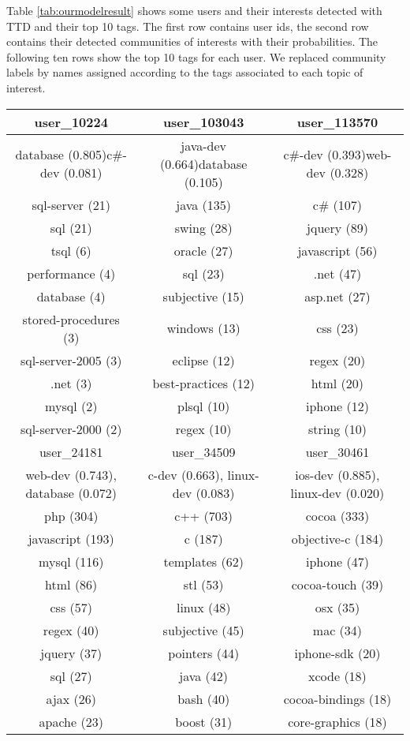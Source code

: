 Table \ref{tab:ourmodelresult} shows some users and their interests detected with TTD and their top 10 tags. The first row contains user ids, the second row contains their detected communities of interests with their probabilities. The following ten rows show the top 10 tags for each user. We replaced community labels by names assigned according to the tags associated to each topic of interest.


\begin{sidewaystable}

\caption{Examples of user interests detected with TTD}
\label{tab:ourmodelresult}
\centering
\begin{tabular}{|c||c||c|}
\hline
user\_10224&user\_103043&user\_113570\\
\hline
database (0.805)\newline c\#-dev (0.081)&java-dev (0.664)\newline database (0.105)&c\#-dev (0.393)\newline web-dev (0.328)\\
\hline
sql-server (21)&java (135)&c\# (107)\\
sql (21)&swing (28)&jquery (89)\\
tsql (6)&oracle (27)&javascript (56)\\
performance (4)&sql (23)&.net (47)\\
database (4)&subjective (15)&asp.net (27)\\
stored-procedures (3)&windows (13)&css (23)\\
sql-server-2005 (3)&eclipse (12)&regex (20)\\
.net (3)&best-practices (12)&html (20)\\
mysql (2)&plsql (10)&iphone (12)\\
%
sql-server-2000 (2)&regex (10)&string (10)\\
\hline
user\_24181&user\_34509&user\_30461\\
\hline
web-dev (0.743), database (0.072)&c-dev (0.663), linux-dev (0.083)&ios-dev (0.885), linux-dev (0.020)\\
\hline
php (304)&c++ (703)&cocoa (333)\\
javascript (193)&c (187)&objective-c (184)\\
mysql (116)&templates (62)&iphone (47)\\
html (86)&stl (53)&cocoa-touch (39)\\
css (57)&linux (48)&osx (35)\\
regex (40)&subjective (45)&mac (34)\\
jquery (37)&pointers (44)&iphone-sdk (20)\\%
sql (27)&java (42)&xcode (18)\\
ajax (26)&bash (40)&cocoa-bindings (18)\\
apache (23)&boost (31)&core-graphics (18)\\
\hline
\end{tabular}



\end{sidewaystable}
